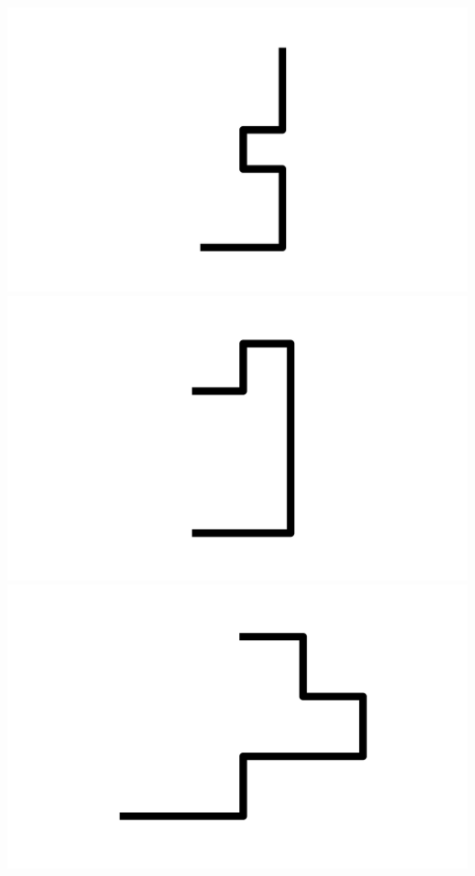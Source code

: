 \documentclass[]{report}
\begin{document}
\includegraphics[scale=.1]{pictures/21/state_cluster_shapes_358.pdf} 
\includegraphics[scale=.1]{pictures/21/state_cluster_shapes_359.pdf} 
\includegraphics[scale=.1]{pictures/21/state_cluster_shapes_360.pdf} 
\end{document}
